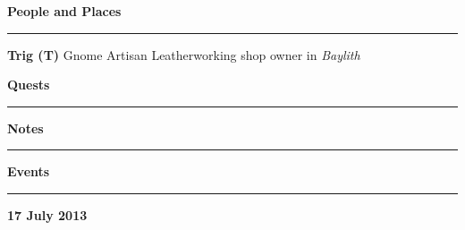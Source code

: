 \documentclass[letterpaper]{article}
\newlength\tindent
\newcommand{\e}[1]{\emph{#1}}
\newcommand{\B}[1]{\textbf{#1}}
\newenvironment{notesection}[1]
{ {\huge \B{#1}}\hrule\vspace{0.5em}\begingroup\fontsize{9pt}{12pt}\selectfont}
{\endgroup}
\newcommand{\person}[3]{\B{#1
    \ifstrequal{#2}{M}{{\color{ProcessBlue}\male}}{%
    \ifstrequal{#2}{F}{\color{VioletRed}\female}{}}}{\scriptsize #3}}
\begin{document}
\twocolumn
\begin{notesection}{People and Places}
\person{Trig (T)}{F}{Gnome Artisan} Leatherworking shop owner in \e{Baylith} \\
\end{notesection}

\begin{notesection}{Quests}
\end{notesection}

\begin{notesection}{Notes}
\end{notesection}

\begin{notesection}{Events}
\setlength{\parindent}{\tindent}
\B{17 July 2013}
\end{notesection}
\end{document}

